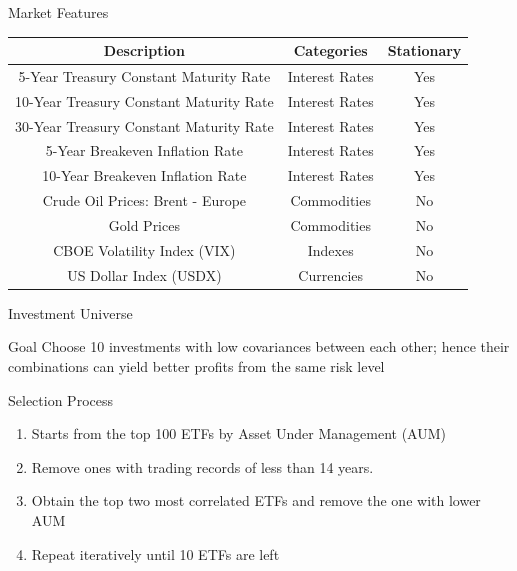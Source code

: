 \begin{frame}{Market Features}
\footnotesize
\begin{tabular}{|| c| c | c||}
\hline
Description & Categories & Stationary \\ \hline \hline
5-Year Treasury Constant Maturity Rate & Interest Rates  & Yes \\ \hline
10-Year Treasury Constant Maturity Rate & Interest Rates & Yes \\ \hline
30-Year Treasury Constant Maturity Rate & Interest Rates & Yes \\ \hline
5-Year Breakeven Inflation Rate & Interest Rates & Yes \\ \hline
10-Year Breakeven Inflation Rate & Interest Rates & Yes \\ \hline
Crude Oil Prices: Brent - Europe &  Commodities & No \\ \hline
Gold Prices &  Commodities & No \\ \hline
CBOE Volatility Index (VIX) &  Indexes & No \\ \hline
US Dollar Index (USDX) &  Currencies & No \\ \hline
\end{tabular}
\end{frame}



\newcommand\mynum[1]{{\renewcommand{\insertenumlabel}{#1}%
      \usebeamertemplate{enumerate item}}}

\begin{frame}{Investment Universe}
\begin{block}{Goal}
Choose 10 investments with low covariances between each other; hence their combinations can yield better profits from the same risk level
\end{block}
\begin{block}{Selection Process}
    \begin{enumerate}
    \item Starts from the top 100 ETFs by Asset Under Management (AUM)
    \item Remove ones with trading records of less than 14 years.
    \item \label{itm:remove_items} Obtain the top two most correlated ETFs and remove the one with lower AUM
    \item Repeat \mynum{\ref{itm:remove_items}} iteratively until 10 ETFs are left
    \end{enumerate}
\end{block}
\end{frame}

